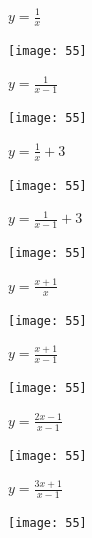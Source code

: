 \documentclass[a4paper]{oblivoir}
\begin{document}
\clearpage
\begin{minipage}{0.45\textwidth}\centering
\(y=\frac1x\)
\par\bigskip\texttt{[image: 55]}
\end{minipage}
\begin{minipage}{0.45\textwidth}\centering
\(y=\frac1{x-1}\)
\par\bigskip\texttt{[image: 55]}
\end{minipage}\bigskip\bigskip\par
\begin{minipage}{0.45\textwidth}\centering
\(y=\frac1x+3\)
\par\bigskip\texttt{[image: 55]}
\end{minipage}
\begin{minipage}{0.45\textwidth}\centering
\(y=\frac1{x-1}+3\)
\par\bigskip\texttt{[image: 55]}
\end{minipage}\bigskip\bigskip\par

\clearpage
\begin{minipage}{0.45\textwidth}\centering
\(y=\frac{x+1}{x}\)
\par\bigskip\texttt{[image: 55]}
\end{minipage}
\begin{minipage}{0.45\textwidth}\centering
\(y=\frac{x+1}{x-1}\)
\par\bigskip\texttt{[image: 55]}
\end{minipage}\bigskip\bigskip\par
\begin{minipage}{0.45\textwidth}\centering
\(y=\frac{2x-1}{x-1}\)
\par\bigskip\texttt{[image: 55]}
\end{minipage}
\begin{minipage}{0.45\textwidth}\centering
\(y=\frac{3x+1}{x-1}\)
\par\bigskip\texttt{[image: 55]}
\end{minipage}\bigskip\bigskip\par
\end{document}
